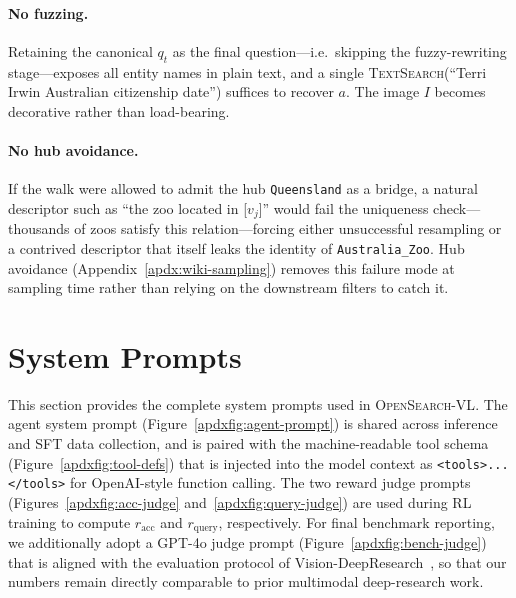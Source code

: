 \paragraph{No fuzzing.}
Retaining the canonical $q_t$ as the final question---i.e.\ skipping the fuzzy-rewriting stage---exposes all entity names in plain text, and a single \textsc{TextSearch}(``Terri Irwin Australian citizenship date'') suffices to recover $a$. The image $I$ becomes decorative rather than load-bearing.

\paragraph{No hub avoidance.}
If the walk were allowed to admit the hub \texttt{Queensland} as a bridge, a natural descriptor such as ``the zoo located in [$v_j$]'' would fail the uniqueness check---thousands of zoos satisfy this relation---forcing either unsuccessful resampling or a contrived descriptor that itself leaks the identity of \texttt{Australia\_Zoo}. Hub avoidance (Appendix~\ref{apdx:wiki-sampling}) removes this failure mode at sampling time rather than relying on the downstream filters to catch it.


\section{System Prompts}
\label{apdx:system-prompts}

This section provides the complete system prompts used in \textsc{OpenSearch-VL}. The agent system prompt (Figure~\ref{apdxfig:agent-prompt}) is shared across inference and SFT data collection, and is paired with the machine-readable tool schema (Figure~\ref{apdxfig:tool-defs}) that is injected into the model context as \texttt{<tools>...</tools>} for OpenAI-style function calling. The two reward judge prompts (Figures~\ref{apdxfig:acc-judge} and~\ref{apdxfig:query-judge}) are used during RL training to compute $r_{\text{acc}}$ and $r_{\text{query}}$, respectively. For final benchmark reporting, we additionally adopt a GPT-4o judge prompt (Figure~\ref{apdxfig:bench-judge}) that is aligned with the evaluation protocol of Vision-DeepResearch~\citep{huang2026vision}, so that our numbers remain directly comparable to prior multimodal deep-research work.

